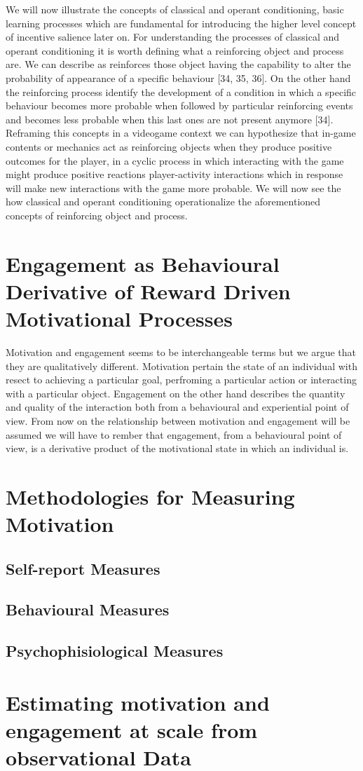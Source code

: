 We will now illustrate the concepts of classical and operant conditioning, basic learning processes which are fundamental for introducing the higher level concept of incentive salience later on. For understanding the processes of classical and operant conditioning it is worth defining what a reinforcing object and process are. We can describe as reinforces those object having the capability to alter the probability of appearance of a specific behaviour [34, 35, 36].  On the other hand the reinforcing process identify the development of a condition in which a specific behaviour becomes more probable when followed by particular reinforcing events and becomes less probable when this last ones are not present anymore [34]. Reframing this concepts in a videogame context we can hypothesize that in-game contents or mechanics act as reinforcing objects when they produce positive outcomes for the player, in a cyclic process in which interacting with the game might produce positive reactions player-activity interactions which in response will make new interactions with the game more probable. 
We will now see the how classical and operant conditioning operationalize the aforementioned concepts of reinforcing object and process.

\section{Engagement as Behavioural Derivative of Reward Driven Motivational Processes}
Motivation and engagement seems to be interchangeable terms but we argue that they are qualitatively different. Motivation pertain the state of an individual with resect to achieving a particular goal, perfroming a particular action or interacting with a particular object. Engagement on the other hand describes the quantity and quality of the interaction both from a behavioural and experiential point of view. From now on the relationship between motivation and engagement will be assumed we will have to rember that engagement, from a behavioural point of view, is a derivative product of the motivational state in which an individual is. 

\section{Methodologies for Measuring Motivation}
    \subsection{Self-report Measures}
    \subsection{Behavioural Measures}
    \subsection{Psychophisiological Measures}

\section{Estimating motivation and engagement at scale from observational Data}
\lorem

\lorem



